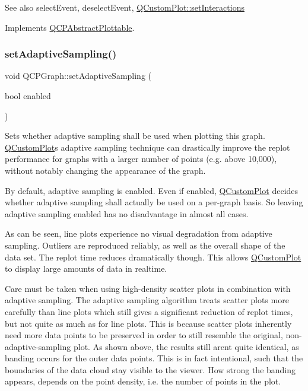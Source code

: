 \begin{DoxySeeAlso}{See also}
select\+Event, deselect\+Event, \mbox{\hyperlink{class_q_custom_plot_a5ee1e2f6ae27419deca53e75907c27e5}{Q\+Custom\+Plot\+::set\+Interactions}} 
\end{DoxySeeAlso}


Implements \mbox{\hyperlink{class_q_c_p_abstract_plottable_a38efe9641d972992a3d44204bc80ec1d}{Q\+C\+P\+Abstract\+Plottable}}.

\mbox{\label{class_q_c_p_graph_ab468cd600160f327836aa0644291e64c}} 
\subsubsection{\texorpdfstring{set\+Adaptive\+Sampling()}{setAdaptiveSampling()}}
{\footnotesize\ttfamily void Q\+C\+P\+Graph\+::set\+Adaptive\+Sampling (\begin{DoxyParamCaption}\item[{bool}]{enabled }\end{DoxyParamCaption})}

Sets whether adaptive sampling shall be used when plotting this graph. \mbox{\hyperlink{class_q_custom_plot}{Q\+Custom\+Plot}}\textquotesingle{}s adaptive sampling technique can drastically improve the replot performance for graphs with a larger number of points (e.\+g. above 10,000), without notably changing the appearance of the graph.

By default, adaptive sampling is enabled. Even if enabled, \mbox{\hyperlink{class_q_custom_plot}{Q\+Custom\+Plot}} decides whether adaptive sampling shall actually be used on a per-\/graph basis. So leaving adaptive sampling enabled has no disadvantage in almost all cases.

 As can be seen, line plots experience no visual degradation from adaptive sampling. Outliers are reproduced reliably, as well as the overall shape of the data set. The replot time reduces dramatically though. This allows \mbox{\hyperlink{class_q_custom_plot}{Q\+Custom\+Plot}} to display large amounts of data in realtime.

 Care must be taken when using high-\/density scatter plots in combination with adaptive sampling. The adaptive sampling algorithm treats scatter plots more carefully than line plots which still gives a significant reduction of replot times, but not quite as much as for line plots. This is because scatter plots inherently need more data points to be preserved in order to still resemble the original, non-\/adaptive-\/sampling plot. As shown above, the results still aren\textquotesingle{}t quite identical, as banding occurs for the outer data points. This is in fact intentional, such that the boundaries of the data cloud stay visible to the viewer. How strong the banding appears, depends on the point density, i.\+e. the number of points in the plot.

